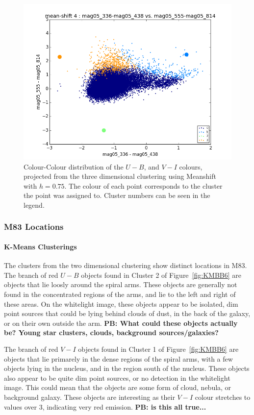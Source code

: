 \begin{figure}[H]
\centering
\includegraphics[width=\linewidth]{figs/meanshift_base_color_4cl_mag05_336-mag05_438vsmag05_555-mag05_814}
\caption{Colour-Colour distribution of the $U - B$, and $V - I$ colours, projected from the three dimensional clustering using Meanshift with $h=0.75$. The colour of each point corresponds to the cluster the point was assigned to. Cluster numbers can be seen in the legend.}
\label{fig:BB3dMS4p}
\end{figure}

\subsubsection{M83 Locations}

\paragraph{K-Means Clusterings}
The clusters from the two dimensional clustering show distinct locations in M83.
The branch of red $U - B$ objects found in Cluster 2 of Figure~\ref{fig:KMBB6} are objects that lie loosly around the spiral arms.
These objects are generally not found in the concentrated regions of the arms, and lie to the left and right of these areas.
On the whitelight image, these objects appear to be isolated, dim point sources that could be lying behind clouds of dust, in the back of the galaxy, or on their own outside the arm.
\textbf{PB: What could these objects actually be? Young star clusters, clouds, background sources/galaxies?}

The branch of red $V - I$ objects found in Cluster 1 of Figure~\ref{fig:KMBB6} are objects that lie primarely in the dense regions of the spiral arms, with a few objects lying in the nucleus, and in the region south of the nucleus.
These objects also appear to be quite dim point sources, or no detection in the whitelight image.
This could mean that the objects are some form of cloud, nebula, or background galaxy. 
These objects are interesting as their $V - I$ colour stretches to values over 3, indicating very red emission. \textbf{PB: is this all true...}

